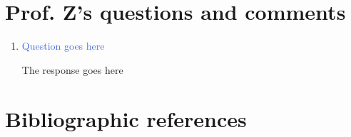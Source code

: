 \documentclass[12pt,letterpaper]{article}
\newcommand{\question}{\textcolor{RoyalBlue}}
\numberwithin{equation}{section}        %
\begin{document}

\clearpage
\section{Prof. Z's questions and comments}

\begin{enumerate} [label=\textcolor{RoyalBlue}{\arabic*.},leftmargin=2.5\baselineskip, itemsep=\baselineskip,parsep=\baselineskip]

\item \question{Question goes here}

The response goes here 



\end{enumerate}





\clearpage
\section*{Bibliographic references}
\printbibliography[heading=none]
\end{document}
